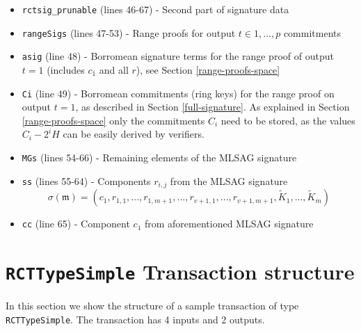 \begin{appendices}
\begin{itemize}
    \item {\tt rctsig\_prunable} (lines 46-67) - Second part of signature data
    \item {\tt rangeSigs} (lines 47-53) - Range proofs for output $t \in {1, ..., p}$ commitments 
    \item {\tt asig} (line 48) - Borromean signature terms for the range proof of output $t = 1$ (includes $c_1$ and all $r$), see Section \ref{range-proofs-space} 
    \item {\tt Ci} (line 49) -  Borromean commitments (ring keys) for the range proof on output $t = 1$, as described in Section \ref{full-signature}. As explained in Section \ref{range-proofs-space} only the commitments $C_i$ need to be stored, as the values $C_i -2^i H$ can be easily derived by verifiers. 
    \item {\tt MGs} (lines 54-66) - Remaining elements of the MLSAG signature
    \item {\tt ss} (lines 55-64) - Components \(r_{i,j}\) from the MLSAG signature
      \[\sigma(\mathfrak{m}) = (c_1, r_{1, 1}, ..., r_{1, m+1}, ..., r_{v+1, 1}, ..., r_{v+1, m+1}, \tilde{K}_1, ...,  \tilde{K}_m) \]
    \item {\tt cc} (line 65) - Component \(c_1\) from aforementioned MLSAG signature
	
\end{itemize}



\chapter{{\tt RCTTypeSimple} Transaction structure}
\label{appendix:RCTTypeSimple}


In this section we show the structure of a sample transaction of type {\tt RCTTypeSimple}. The transaction has 4 inputs and 2 outputs.




\end{appendices}
